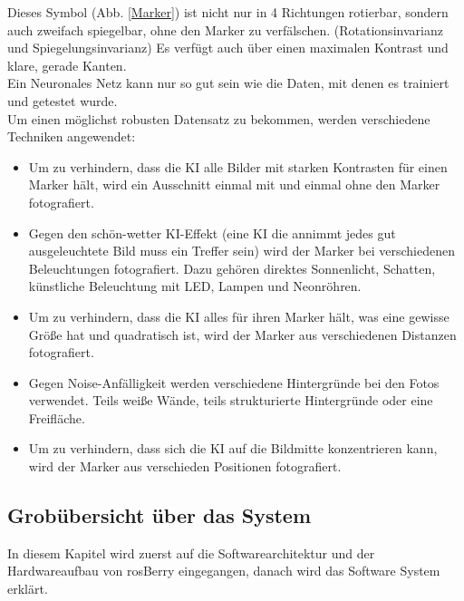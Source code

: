 \documentclass[conference]{IEEEtran}
\begin{document}
	Dieses Symbol (Abb. \ref{Marker}) ist nicht nur in 4 Richtungen rotierbar, sondern auch zweifach spiegelbar, ohne den Marker zu verfälschen. (Rotationsinvarianz und Spiegelungsinvarianz)
	Es verfügt auch über einen maximalen Kontrast und klare, gerade Kanten.
	\\
	\noindent
	Ein Neuronales Netz kann nur so gut sein wie die Daten, mit denen es 
	trainiert und getestet wurde.
	\\
	Um einen möglichst robusten Datensatz zu bekommen, werden verschiedene Techniken angewendet:
	\begin{itemize}
		\item Um zu verhindern, dass die KI alle Bilder mit starken Kontrasten für einen Marker hält, wird ein Ausschnitt einmal mit und einmal ohne den Marker fotografiert.
		\item Gegen den \glqq schön-wetter KI\grqq-Effekt (eine KI die annimmt jedes gut ausgeleuchtete Bild muss ein Treffer sein) wird der Marker bei verschiedenen Beleuchtungen fotografiert.
		Dazu gehören direktes Sonnenlicht, Schatten, künstliche Beleuchtung mit LED, Lampen und Neonröhren. 
		\item Um zu verhindern, dass die KI alles für ihren Marker hält, was eine gewisse Größe hat und quadratisch ist, wird der Marker aus verschiedenen Distanzen fotografiert. 
		\item Gegen Noise-Anfälligkeit werden verschiedene Hintergründe bei den Fotos verwendet. Teils weiße Wände, teils strukturierte Hintergründe oder eine Freifläche. 
		\item Um zu verhindern, dass sich die KI auf die Bildmitte konzentrieren kann, wird der Marker aus verschieden Positionen fotografiert. 
	\end{itemize}
	
	
	\subsection{Grobübersicht über das System}
	In diesem Kapitel wird zuerst auf die Softwarearchitektur und der 
	Hardwareaufbau von rosBerry eingegangen, danach wird das Software 
	System erklärt.
	
\end{document}
